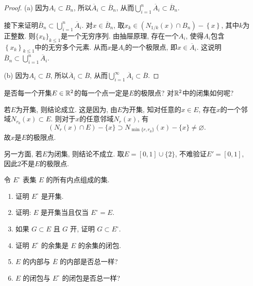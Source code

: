 \documentclass{article}
\begin{document}
\begin{proof}
    (a) 因为\( A_i \subset B_n \), 所以\( \overline{A}_i \subset \overline{B}_n \), 从而\( \bigcup_{i=1}^n \overline{A}_i \subset \overline{B}_n \). \par
    接下来证明\( \overline{B}_n\subset\bigcup_{i=1}^{n}\overline{A }_i  \). 对\( x\in\overline{B}_n \), 取\( x_k\in (N_{1/k}(x)\cap B_n)-\left\{x\right\} \), 其中\( k \)为正整数. 则\( \{x_k\}_{k\le 1} \)是一个无穷序列. 由抽屉原理, 存在一个\( A_i \), 使得\( A_i \)包含\( \left\{x_k\right\}_{k\le 1 } \)中的无穷多个元素. 从而\( x \)是\( A_i \)的一个极限点, 即\( x\in\overline{A}_i \). 这说明\( \overline{B}_n\subset\bigcup_{i=1}^{n}\overline{A }_i  \). \par
    (b) 因为\( A_i \subset B \), 所以\( \overline{A}_i \subset \overline{B} \), 从而\( \bigcup_{i=1}^\infty \overline{A}_i \subset \overline{B} \).
\end{proof}

\begin{problem}[2-8]
    是否每一个开集\( E\in\mathbb{R}^2 \)的每一个点一定是\( E  \)的极限点? 对\( \mathbb{R}^2 \)中的闭集如何呢?
\end{problem}

\begin{solution}
    若\( E  \)为开集, 则结论成立. 这是因为, 由\( E  \)为开集, 知对任意的\( x\in E  \), 存在\( x \)的一个邻域\( N_{r_0}(x)\subset E  \). 则对于\( x \)的任意邻域\( N_{r}(x) \), 有
    \[ (N_{r}(x)\cap E)-\{x\}\supset N_{\min\{r,r_0\}}(x)-\{x\}\neq\varnothing. \] 
    故\( x \)是\( E  \)的极限点.\par
    另一方面, 若\( E \)为闭集, 则结论不成立. 取\( E=[0,1]\cup\{2\} \), 不难验证\( E'=[0,1] \), 因此\( 2 \)不是\( E  \)的极限点.
\end{solution}

\begin{problem}[2-9]
    令 \( E^\circ \) 表集 \( E \) 的所有内点组成的集. 
    \begin{enumerate}[label=(\alph*)]
        \item 证明 \( E^\circ \) 是开集. 
        \item 证明: \( E \) 是开集当且仅当 \( E^\circ = E \). 
        \item 如果 \( G \subset E \) 且 \( G \) 开, 证明 \( G \subset E^\circ \). 
        \item 证明 \( E^\circ \) 的余集是 \( E \) 的余集的闭包. 
        \item \( E \) 的内部与 \( \overline{E } \) 的内部是否总一样? 
        \item \( E \) 的闭包与 \( E^\circ \) 的闭包是否总一样? 
    \end{enumerate}
\end{problem}
\end{document}
